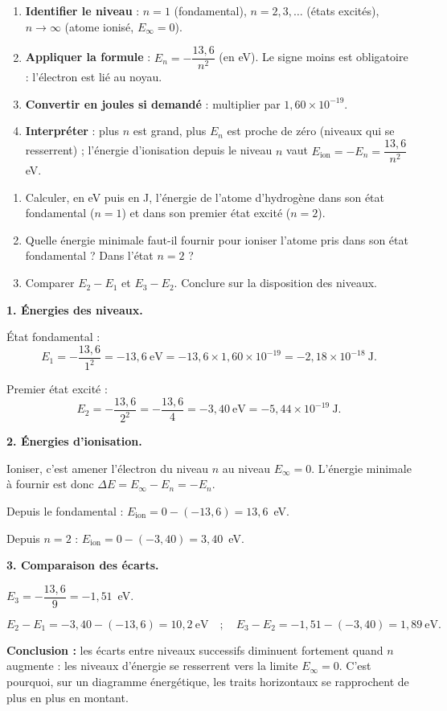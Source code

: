 \documentclass[11pt]{article}
\begin{document}
\begin{methode}
\begin{enumerate}
\item \textbf{Identifier le niveau} : $n = 1$ (fondamental), $n = 2, 3, \ldots$ (états excités), $n \to \infty$ (atome ionisé, $E_\infty = 0$).
\item \textbf{Appliquer la formule} : $E_n = -\dfrac{13{,}6}{n^2}$ (en eV). Le signe moins est obligatoire : l'électron est lié au noyau.
\item \textbf{Convertir en joules si demandé} : multiplier par $1{,}60\times 10^{-19}$.
\item \textbf{Interpréter} : plus $n$ est grand, plus $E_n$ est proche de zéro (niveaux qui se resserrent) ; l'énergie d'ionisation depuis le niveau $n$ vaut $E_{\text{ion}} = -E_n = \dfrac{13{,}6}{n^2}$ eV.
\end{enumerate}
\end{methode}

\begin{exoresolu}
\begin{enumerate}
\item Calculer, en eV puis en J, l'énergie de l'atome d'hydrogène dans son état fondamental ($n=1$) et dans son premier état excité ($n=2$).
\item Quelle énergie minimale faut-il fournir pour ioniser l'atome pris dans son état fondamental ? Dans l'état $n=2$ ?
\item Comparer $E_2 - E_1$ et $E_3 - E_2$. Conclure sur la disposition des niveaux.
\end{enumerate}
\tcblower
\textbf{1. Énergies des niveaux.}

État fondamental :
\[
E_1 = -\frac{13{,}6}{1^2} = -13{,}6~\text{eV} = -13{,}6\times 1{,}60\times 10^{-19} = -2{,}18\times 10^{-18}~\text{J}.
\]

Premier état excité :
\[
E_2 = -\frac{13{,}6}{2^2} = -\frac{13{,}6}{4} = -3{,}40~\text{eV} = -5{,}44\times 10^{-19}~\text{J}.
\]

\textbf{2. Énergies d'ionisation.}

Ioniser, c'est amener l'électron du niveau $n$ au niveau $E_\infty = 0$. L'énergie minimale à fournir est donc $\Delta E = E_\infty - E_n = -E_n$.

Depuis le fondamental : $E_{\text{ion}} = 0 - (-13{,}6) = 13{,}6$~eV.

Depuis $n=2$ : $E_{\text{ion}} = 0 - (-3{,}40) = 3{,}40$~eV.

\textbf{3. Comparaison des écarts.}

$E_3 = -\dfrac{13{,}6}{9} = -1{,}51$~eV.

\[
E_2 - E_1 = -3{,}40 - (-13{,}6) = 10{,}2~\text{eV} \quad ; \quad E_3 - E_2 = -1{,}51 - (-3{,}40) = 1{,}89~\text{eV}.
\]

\textbf{Conclusion :} les écarts entre niveaux successifs diminuent fortement quand $n$ augmente : les niveaux d'énergie se resserrent vers la limite $E_\infty = 0$. C'est pourquoi, sur un diagramme énergétique, les traits horizontaux se rapprochent de plus en plus en montant.
\end{exoresolu}
\end{document}
